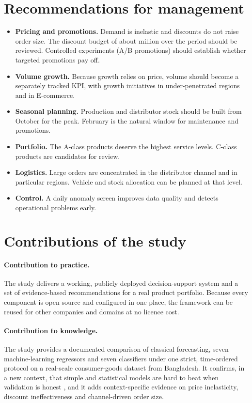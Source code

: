 \section{Recommendations for management}
\begin{itemize}
  \item \textbf{Pricing and promotions.} Demand is inelastic and discounts do not raise order size. The discount
        budget of about \BDT\DiscountCost million over the period should be reviewed. Controlled experiments
        (A/B promotions) should establish whether targeted promotions pay off.
  \item \textbf{Volume growth.} Because growth relies on price, volume should become a separately tracked KPI,
        with growth initiatives in under-penetrated regions and in E-commerce.
  \item \textbf{Seasonal planning.} Production and distributor stock should be built from October for the
        \PeakMonth peak. February is the natural window for maintenance and promotions.
  \item \textbf{Portfolio.} The A-class products deserve the highest service levels. C-class products are
        candidates for review.
  \item \textbf{Logistics.} Large orders are concentrated in the distributor channel and in particular regions.
        Vehicle and stock allocation can be planned at that level.
  \item \textbf{Control.} A daily anomaly screen improves data quality and detects operational problems early.
\end{itemize}

\section{Contributions of the study}
\paragraph{Contribution to practice.} The study delivers a working, publicly deployed decision-support system and
a set of evidence-based recommendations for a real product portfolio. Because every component is open source
and configured in one place, the framework can be reused for other companies and domains at no licence cost.

\paragraph{Contribution to knowledge.} The study provides a documented comparison of classical forecasting,
seven machine-learning regressors and seven classifiers under one strict, time-ordered protocol on a
real-scale consumer-goods dataset from Bangladesh. It confirms, in a new context, that simple and statistical
models are hard to beat when validation is honest \citep{hyndman2021}, and it adds context-specific evidence
on price inelasticity, discount ineffectiveness and channel-driven order size.

